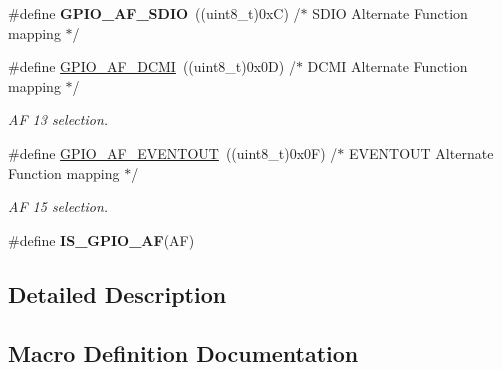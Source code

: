 \begin{DoxyCompactItemize}
\item 
\mbox{\label{group___g_p_i_o___alternat__function__selection__define_ga0ae9928f85fc99947659994eb025cc2b}} 
\#define {\bfseries G\+P\+I\+O\+\_\+\+A\+F\+\_\+\+S\+D\+IO}~((uint8\+\_\+t)0x\+C)  /$\ast$ S\+D\+I\+O Alternate Function mapping $\ast$/
\item 
\mbox{\label{group___g_p_i_o___alternat__function__selection__define_gaa7bfafac663bac5d437bd6d6a2f6774d}} 
\#define \hyperlink{group___g_p_i_o___alternat__function__selection__define_gaa7bfafac663bac5d437bd6d6a2f6774d}{G\+P\+I\+O\+\_\+\+A\+F\+\_\+\+D\+C\+MI}~((uint8\+\_\+t)0x0\+D)  /$\ast$ D\+C\+M\+I Alternate Function mapping $\ast$/
\begin{DoxyCompactList}\small\item\em AF 13 selection. \end{DoxyCompactList}\item 
\mbox{\label{group___g_p_i_o___alternat__function__selection__define_gacd5e7846b3709cddbf41ece2b1fb068e}} 
\#define \hyperlink{group___g_p_i_o___alternat__function__selection__define_gacd5e7846b3709cddbf41ece2b1fb068e}{G\+P\+I\+O\+\_\+\+A\+F\+\_\+\+E\+V\+E\+N\+T\+O\+UT}~((uint8\+\_\+t)0x0\+F)  /$\ast$ E\+V\+E\+N\+T\+O\+U\+T Alternate Function mapping $\ast$/
\begin{DoxyCompactList}\small\item\em AF 15 selection. \end{DoxyCompactList}\item 
\#define {\bfseries I\+S\+\_\+\+G\+P\+I\+O\+\_\+\+AF}(AF)
\end{DoxyCompactItemize}


\subsection{Detailed Description}


\subsection{Macro Definition Documentation}
\mbox{\label{group___g_p_i_o___alternat__function__selection__define_ga79eead44ddc05f1aa13d93c69196bced}} 
